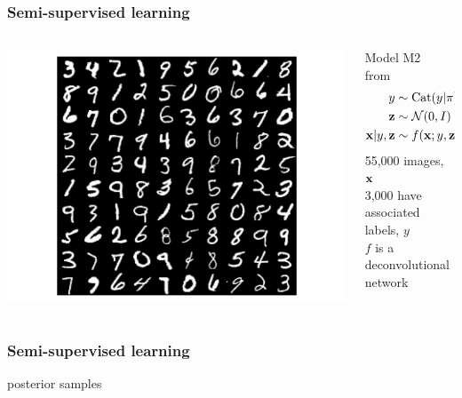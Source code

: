 \documentclass[10pt]{beamer}
\begin{document}
\begin{frame}
  \frametitle{Semi-supervised learning}

  \begin{columns}
    \begin{column}{0.4\textwidth}
      \includegraphics[width=\textwidth]{img/mnist-digits-small}
    \end{column}
    \begin{column}{0.6\textwidth}
      \begin{center}
        Model M2 from~\cite{kingma_semi-supervised_2014}
        \begin{align*}
          y &\sim \textnormal{Cat}(y|\pi) \\
          \boldsymbol{\mathbf{z}} &\sim \mathcal{N}(0, I) \\
          \boldsymbol{\mathbf{x}}|y, \boldsymbol{\mathbf{z}} &\sim f(\boldsymbol{\mathbf{x}}; y, \boldsymbol{\mathbf{z}}, \theta)
        \end{align*}
        55,000 images, $\boldsymbol{\mathbf{x}}$ \\
        3,000 have associated labels, $y$ \\
        $f$ is a deconvolutional network
      \end{center}
    \end{column}

  \end{columns}
\end{frame}



\begin{frame}
  \frametitle{Semi-supervised learning}

  posterior samples
\end{frame}
\end{document}
